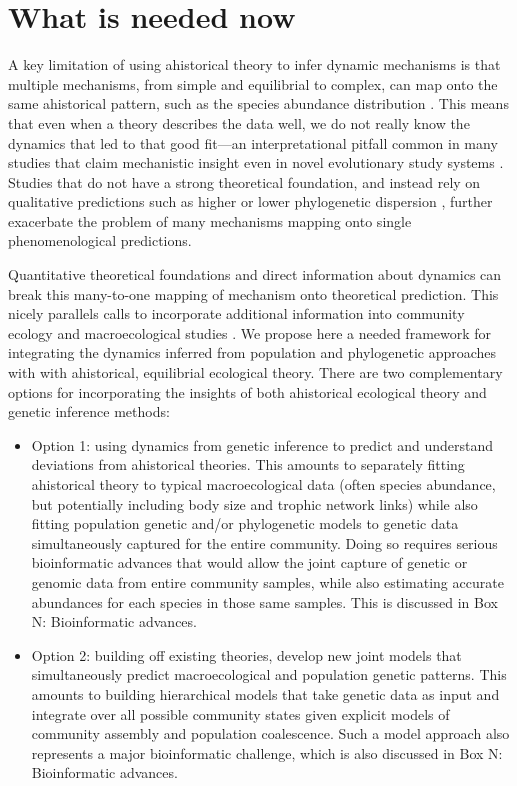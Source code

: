 \documentclass[12pt]{article}
\begin{document}
\section{What is needed now}

A key limitation of using ahistorical theory to infer dynamic
mechanisms is that multiple mechanisms, from simple and equilibrial to
complex, can map onto the same ahistorical pattern, such as the
species abundance distribution \cite{Kendall1948-pj, Kendall1948-ri,
  Engen1996-jt, Engen1996-na, McGill2003-sf}.  This means that even
when a theory describes the data well, we do not really know the
dynamics that led to that good fit---an interpretational pitfall
common in many studies that claim mechanistic insight even in novel
evolutionary study systems \cite{Hubbell2001-dx, Olszewski2004-ud,
  Wagner2006-te}.  Studies that do not have a strong theoretical
foundation, and instead rely on qualitative predictions such as higher
or lower phylogenetic dispersion \cite{Webb2002-yr}, further
exacerbate the problem of many mechanisms mapping onto single
phenomenological predictions.

Quantitative theoretical foundations and direct information about
dynamics can break this many-to-one mapping of mechanism onto
theoretical prediction. This nicely parallels calls to incorporate
additional information into community ecology and macroecological
studies \cite{McGill2007-zd}. We propose here a needed
framework for integrating the dynamics inferred from population and
phylogenetic approaches with with ahistorical, equilibrial ecological
theory. There are two complementary options for incorporating the
insights of both ahistorical ecological theory and genetic inference
methods:

\begin{itemize}
\item Option 1: using dynamics from genetic inference to predict and
  understand deviations from ahistorical theories. This amounts to
  separately fitting ahistorical theory to typical macroecological
  data (often species abundance, but potentially including body size
  and trophic network links) while also fitting population genetic
  and/or phylogenetic models to genetic data simultaneously captured
  for the entire community. Doing so requires serious bioinformatic
  advances that would allow the joint capture of genetic or genomic
  data from entire community samples, while also estimating accurate
  abundances for each species in those same samples. This is discussed
  in Box N: Bioinformatic advances.
\item Option 2: building off existing theories, develop new joint
  models that simultaneously predict macroecological and population
  genetic patterns. This amounts to building hierarchical models that
  take genetic data as input and integrate over all possible community
  states given explicit models of community assembly and population
  coalescence. Such a model approach also represents a major
  bioinformatic challenge, which is also discussed in Box N:
  Bioinformatic advances.
\end{itemize}
\end{document}
